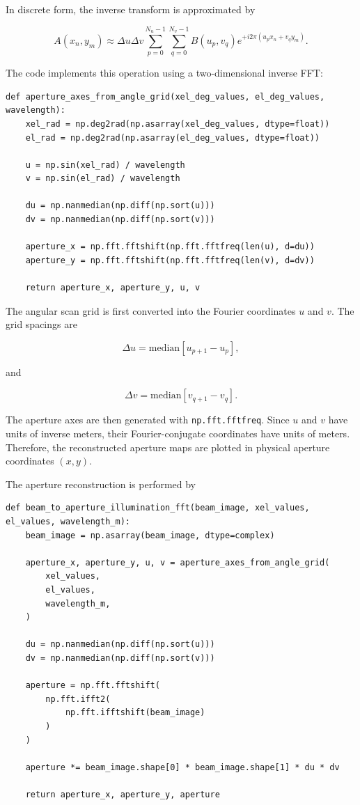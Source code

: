 \documentclass[12pt]{extarticle}
\begin{document}
In discrete form, the inverse transform is approximated by

\begin{equation}
    A(x_n,y_m)
    \approx
    \Delta u \Delta v
    \sum_{p=0}^{N_u-1}
    \sum_{q=0}^{N_v-1}
    B(u_p,v_q)
    e^{+i2\pi(u_p x_n + v_q y_m)}.
\end{equation}

The code implements this operation using a two-dimensional inverse FFT:

\begin{lstlisting}
def aperture_axes_from_angle_grid(xel_deg_values, el_deg_values, wavelength):
    xel_rad = np.deg2rad(np.asarray(xel_deg_values, dtype=float))
    el_rad = np.deg2rad(np.asarray(el_deg_values, dtype=float))

    u = np.sin(xel_rad) / wavelength
    v = np.sin(el_rad) / wavelength

    du = np.nanmedian(np.diff(np.sort(u)))
    dv = np.nanmedian(np.diff(np.sort(v)))

    aperture_x = np.fft.fftshift(np.fft.fftfreq(len(u), d=du))
    aperture_y = np.fft.fftshift(np.fft.fftfreq(len(v), d=dv))

    return aperture_x, aperture_y, u, v
\end{lstlisting}

The angular scan grid is first converted into the Fourier coordinates $u$ and $v$. The grid spacings are

\begin{equation}
    \Delta u
    =
    \mathrm{median}
    \left[
    u_{p+1} - u_p
    \right],
\end{equation}

and

\begin{equation}
    \Delta v
    =
    \mathrm{median}
    \left[
    v_{q+1} - v_q
    \right].
\end{equation}

The aperture axes are then generated with \texttt{np.fft.fftfreq}. Since $u$ and $v$ have units of inverse meters, their Fourier-conjugate coordinates have units of meters. Therefore, the reconstructed aperture maps are plotted in physical aperture coordinates $(x,y)$.

The aperture reconstruction is performed by

\begin{lstlisting}
def beam_to_aperture_illumination_fft(beam_image, xel_values, el_values, wavelength_m):
    beam_image = np.asarray(beam_image, dtype=complex)

    aperture_x, aperture_y, u, v = aperture_axes_from_angle_grid(
        xel_values,
        el_values,
        wavelength_m,
    )

    du = np.nanmedian(np.diff(np.sort(u)))
    dv = np.nanmedian(np.diff(np.sort(v)))

    aperture = np.fft.fftshift(
        np.fft.ifft2(
            np.fft.ifftshift(beam_image)
        )
    )

    aperture *= beam_image.shape[0] * beam_image.shape[1] * du * dv

    return aperture_x, aperture_y, aperture
\end{lstlisting}
\end{document}
